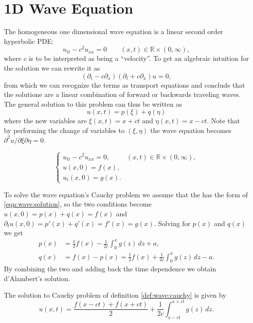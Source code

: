 
\section{1D Wave Equation}

The homogeneous one dimensional wave equation is a linear second order
hyperbolic PDE:
\[
  u_{tt} - c^2 u_{xx} = 0
  \qquad (x, t) \in \mathbb{R} \times (0, \infty),
\]
where $c$ is to be interpreted as being a ``velocity''. To get an algebraic
intuition for the solution we can rewrite it as
\[
  (\partial_t - c\partial_x)(\partial_t + c\partial_x) u = 0,
\]
from which we can recognize the terms as transport equations and conclude that
the solutione are a linear combination of forward or backwards traveling
waves. The general solution to this problem can thus be written as
\begin{equation} \label{eqn:wave:solution}
  u(x,t) = p(\xi) + q(\eta)
\end{equation}
where the new variables are $\xi(x,t) = x + ct$ and $\eta(x,t) = x - ct$.
Note that by performing the change of variables to $(\xi,\eta)$ the wave
equation becomes $\partial^2 u /\partial\xi\partial\eta = 0$.

\begin{defn}
  \label{def:wave:cauchy}
  \[
    \begin{cases}
      u_{tt} - c^2 u_{xx} = 0, & (x, t) \in \mathbb{R} \times (0, \infty), \\
      u(x,0) = f(x), \\
      u_t(x,0) = g(x).
    \end{cases}
  \]
\end{defn}

To solve the wave equation's Cauchy problem we assume that the has the form of 
\eqref{eqn:wave:solution}, so the two conditions become $u(x,0) = p(x) + q(x)
= f(x)$ and $\partial_t u(x,0) = p'(x) + q'(x) = f'(x) = g(x)$. Solving for
$p(x)$ and $q(x)$ we get
\begin{align*}
  p(x) &= \frac{1}{2}f(x) - \frac{1}{2c}\int_0^x g(z) \, dz + a, \\
  q(x) &= f(x) - p(x) = \frac{1}{2}f(x) + \frac{1}{2c} \int_0^x g(z) \, dz -a.
\end{align*}
By combining the two and adding back the time dependence we obtain
d'Alambert's solution.
\begin{thm}
  The solution to Cauchy problem of definition \ref{def:wave:cauchy} is given
  by
  \[
    u(x,t) = \frac{f(x-ct) + f(x+ct)}{2} 
      + \frac{1}{2c} \int_{x-ct}^{x+ct} g(z) \,dz.
  \]
\end{thm}


